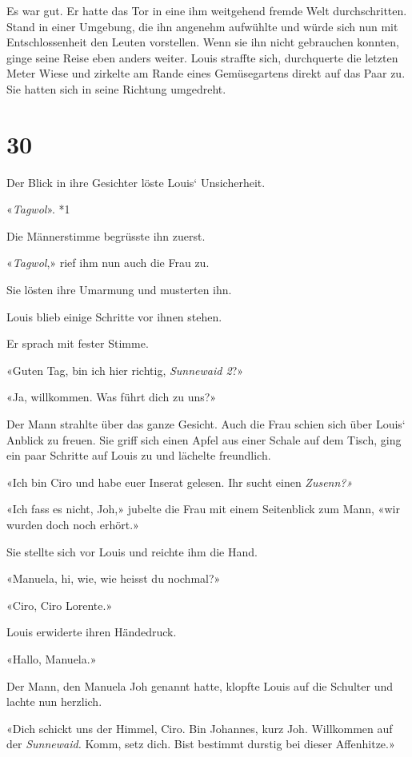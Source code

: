 Es war gut. Er hatte das Tor in eine ihm weitgehend fremde Welt
durchschritten. Stand in einer Umgebung, die ihn angenehm aufwühlte und
würde sich nun mit Entschlossenheit den Leuten vorstellen. Wenn sie ihn
nicht gebrauchen konnten, ginge seine Reise eben anders weiter. Louis
straffte sich, durchquerte die letzten Meter Wiese und zirkelte am Rande
eines Gemüsegartens direkt auf das Paar zu. Sie hatten sich in seine
Richtung umgedreht.

\chapter{30}\label{section-29}

Der Blick in ihre Gesichter löste Louis` Unsicherheit.

«\emph{Tagwol}». *1

Die Männerstimme begrüsste ihn zuerst.

«\emph{Tagwol},» rief ihm nun auch die Frau zu.

Sie lösten ihre Umarmung und musterten ihn.

Louis blieb einige Schritte vor ihnen stehen.

Er sprach mit fester Stimme.

«Guten Tag, bin ich hier richtig, \emph{Sunnewaid 2}?»

«Ja, willkommen. Was führt dich zu uns?»

Der Mann strahlte über das ganze Gesicht. Auch die Frau schien sich über
Louis` Anblick zu freuen. Sie griff sich einen Apfel aus einer Schale
auf dem Tisch, ging ein paar Schritte auf Louis zu und lächelte
freundlich.

«Ich bin Ciro und habe euer Inserat gelesen. Ihr sucht einen
\emph{Zusenn?»}

«Ich fass es nicht, Joh,» jubelte die Frau mit einem Seitenblick zum
Mann, «wir wurden doch noch erhört.»

Sie stellte sich vor Louis und reichte ihm die Hand.

«Manuela, hi, wie, wie heisst du nochmal?»

«Ciro, Ciro Lorente.»

Louis erwiderte ihren Händedruck.

«Hallo, Manuela.»

Der Mann, den Manuela Joh genannt hatte, klopfte Louis auf die Schulter
und lachte nun herzlich.

«Dich schickt uns der Himmel, Ciro. Bin Johannes, kurz Joh. Willkommen
auf der \emph{Sunnewaid.} Komm, setz dich. Bist bestimmt durstig bei
dieser Affenhitze.»

